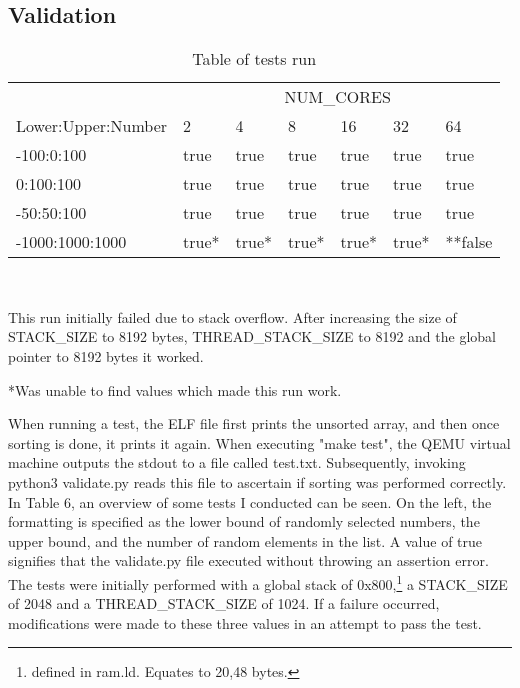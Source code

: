 \subsection{Validation}\label{sec:validate}
\begin{table}
  \caption{Table of tests run}\label{tab:tests}
  \begin{center}
    \begin{tabular}[c]{l|l|l|l|l|l|l}
      & \multicolumn{6}{c}{NUM\_CORES}\\
      \cline{2-7}
      Lower:Upper:Number & 2 & 4 & 8 & 16 & 32 & 64\\
      \hline
      -100:0:100 & true & true & true & true & true & true \\
      \hline
      0:100:100 & true & true & true & true & true & true\\
      \hline
      -50:50:100 & true & true & true & true & true & true \\
      \hline
      -1000:1000:1000 & true* & true* & true* & true* & true* & **false
    \end{tabular} \\
    \vspace{1em}
    \raggedright{\footnotesize *This run initially failed due to stack overflow. After
    increasing the size of STACK\_SIZE to 8192 bytes, THREAD\_STACK\_SIZE to
  8192 and the global pointer to 8192 bytes it worked.} \\
    \raggedright{\footnotesize **Was unable to find values which made this run work.}
  \end{center}
\end{table}

When running a test, the ELF file first prints the unsorted array, and then once
sorting is done, it prints it again. When executing "make test", the QEMU
virtual machine outputs the stdout to a file called test.txt. Subsequently,
invoking python3 validate.py reads this file to ascertain if sorting was
performed correctly. In Table 6, an overview of some tests I conducted can be
seen. On the left, the formatting is specified as the lower bound of randomly
selected numbers, the upper bound, and the number of random elements in the
list. A value of true signifies that the validate.py file executed without
throwing an assertion error. The tests were initially performed with a global
stack of 0x800,\footnote{defined in ram.ld. Equates to 20,48 bytes.} a
STACK\_SIZE of 2048 and a THREAD\_STACK\_SIZE of 1024. If a failure occurred,
modifications were made to these three values in an attempt to pass the test.


